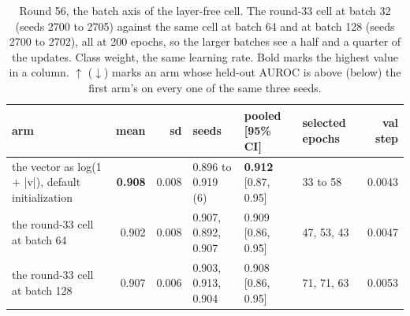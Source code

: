 \begin{table}[H]
  \centering
  \footnotesize
  \caption[Round 56, the batch axis of the layer-free cell]{Round 56, the batch axis of the layer-free cell. The round-33 cell at batch 32 (seeds 2700 to 2705) against the same cell at batch 64 and at batch 128 (seeds 2700 to 2702), all at 200 epochs, so the larger batches see a half and a quarter of the updates. Class weight, the same learning rate. Bold marks the highest value in a column. $\uparrow$ ($\downarrow$) marks an arm whose held-out AUROC is above (below) the first arm's on every one of the same three seeds.}
  \label{tab:w72}
  \begin{tabular}{@{}lrrlllr@{}}
    \hline
    arm & mean & sd & seeds & pooled [95\% CI] & selected epochs & val step \\
    \hline
    the vector as log(1 $+$ |v|), default initialization & \textbf{0.908} & 0.008 & 0.896 to 0.919 (6) & \textbf{0.912} [0.87, 0.95] & 33 to 58 & 0.0043 \\
    the round-33 cell at batch 64 & 0.902 & 0.008 & 0.907, 0.892, 0.907 & 0.909 [0.86, 0.95] & 47, 53, 43 & 0.0047 \\
    the round-33 cell at batch 128 & 0.907 & 0.006 & 0.903, 0.913, 0.904 & 0.908 [0.86, 0.95] & 71, 71, 63 & 0.0053 \\
    \hline
  \end{tabular}
\end{table}
